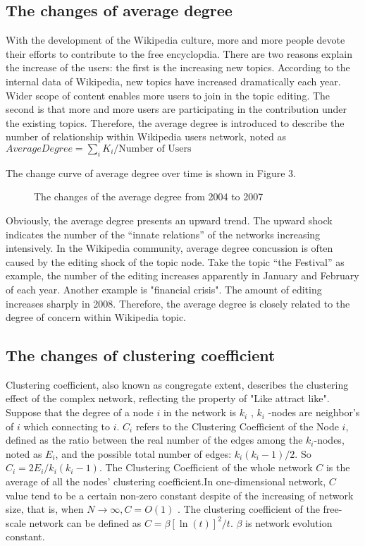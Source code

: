 \documentclass{elsarticle}
\begin{document}
\subsection{The changes of average degree}
\label{sec:chang-aver-degr}

With the development of the Wikipedia culture, more and more people devote
their efforts to contribute to the free encyclopdia.  There are two
reasons explain the increase of the users: the first
is the increasing new topics. According to the internal data of
Wikipedia, new topics have increased dramatically each year.
Wider scope of content enables more users to join in the topic editing. The
second is that more and more users are participating in the
contribution under the existing topics. Therefore, the average degree
is introduced to describe the number of relationship within Wikipedia users
network, noted as $AverageDegree = \sum_iK_i/\text{Number of Users}$

The change curve of average degree over time is shown in Figure 3. 
\begin{figure}[htpb]
  \centering
  \scalebox{0.3}{\texttt{[image: 03]}}
  \caption{The changes of the average degree from 2004 to 2007}
\end{figure}
Obviously, the average degree presents an upward trend. The upward shock  indicates the number of the “innate
relations” of the  networks increasing intensively. In the Wikipedia
community, average degree concussion is often caused by the editing shock of
the topic node. Take the topic “the Festival” as example, the number
of the editing increases apparently in January and February of each
year. Another example is "financial crisis". The amount of editing  increases sharply in 2008. Therefore, the average degree is closely related to the degree of concern within Wikipedia topic.

\subsection{ The changes of clustering coefficient}
\label{sec:chang-clust-coeff}

Clustering coefficient, also known as congregate extent, describes the
clustering effect of the complex network, reflecting the property
of "Like attract like". Suppose that the degree of a node $i$ in the
network is $k_i$  , $k_i$ -nodes are neighbor's of $i$ which
connecting to $i$.  $C_i$  refers to the Clustering
Coefficient of the Node $i$,  defined as the ratio between the
real number of the edges among the $k_i$-nodes, noted as $E_i$, and the possible total
number of edges: $k_i(k_i-1)/2$. So  $C_i=2E_i/k_i(k_i-1)$. The
Clustering Coefficient of the whole network $C$ is the average of all
the nodes’ clustering coefficient.In one-dimensional network, $C$ value  tend to be a certain non-zero
constant despite of the increasing of network size, that is, when
$N\rightarrow\infty,C=O(1)$ . The clustering coefficient of the
free-scale network  can be defined as $C=\beta[\ln(t)]^2/t$. $\beta$
is network evolution constant.
\end{document}
